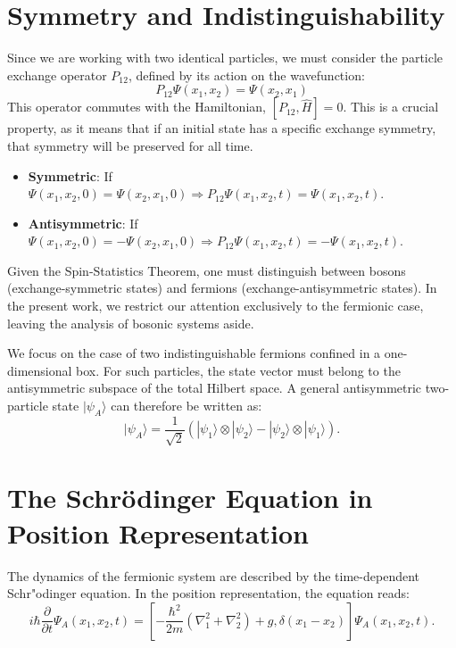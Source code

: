 \section{Symmetry and Indistinguishability}

Since we are working with two identical particles, we must consider the particle exchange operator $P_{12}$, defined by its action on the wavefunction:
\begin{equation}
    P_{12}\Psi(x_1, x_2) = \Psi(x_2, x_1)
\end{equation}
This operator commutes with the Hamiltonian, $[P_{12}, \hat{H}] = 0$. This is a crucial property, as it means that if an initial state has a specific exchange symmetry, that symmetry will be preserved for all time.
\begin{itemize}
    \item \textbf{Symmetric}: If $\Psi(x_1, x_2, 0) = \Psi(x_2, x_1, 0) \Rightarrow P_{12}\Psi(x_1, x_2, t) = \Psi(x_1, x_2, t)$.
    \item \textbf{Antisymmetric}: If $\Psi(x_1, x_2, 0) = -\Psi(x_2, x_1, 0) \Rightarrow P_{12}\Psi(x_1, x_2, t) = -\Psi(x_1, x_2, t)$.
\end{itemize}
Given the Spin-Statistics Theorem, one must distinguish between bosons (exchange-symmetric states) and fermions (exchange-antisymmetric states). In the present work, we restrict our attention exclusively to the fermionic case, leaving the analysis of bosonic systems aside.


We focus on the case of two indistinguishable fermions confined in a one-dimensional box. For such particles, the state vector must belong to the antisymmetric subspace of the total Hilbert space. A general antisymmetric two-particle state $|\psi_A\rangle$ can therefore be written as:
\begin{equation}
|\psi_A\rangle = \frac{1}{\sqrt{2}} \left( |\psi_1\rangle \otimes |\psi_2\rangle - |\psi_2\rangle \otimes |\psi_1\rangle \right).
\end{equation}

\section{The Schrödinger Equation in Position Representation}

The dynamics of the fermionic system are described by the time-dependent Schr"odinger equation. In the position representation, the equation reads:
\begin{equation}
i\hbar\frac{\partial}{\partial t}\Psi_A(x_1, x_2, t) = \left[ -\frac{\hbar^2}{2m}(\nabla_1^2 + \nabla_2^2) + g,\delta(x_1 - x_2) \right] \Psi_A(x_1, x_2, t).
\end{equation}


